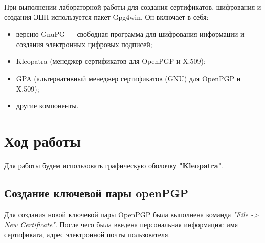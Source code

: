 \documentclass[10pt,a4paper]{report}
\begin{document}
При выполнении лабораторной работы для создания сертификатов, шифрования и создания ЭЦП используется пакет
Gpg4win. Он включает в себя:
\begin{itemize}
\item версию GnuPG — свободная программа для шифрования информации и создания электронных цифровых подписей;
\item Kleopatra (менеджер сертификатов для OpenPGP и X.509);
\item GPA (альтернативный менеджер сертификатов (GNU) для OpenPGP и X.509);
\item другие компоненты.
\end{itemize}
\pagebreak
\section{Ход работы}
Для работы будем использовать графическую оболочку \textbf{"Kleopatra"}.
\subsection{Создание ключевой пары openPGP}
Для создания новой ключевой пары OpenPGP была выполнена команда \textit{"File -> New Certificate"}. После чего была введена персональная информация: имя сертификата, адрес электронной почты пользователя.%




\end{document}
